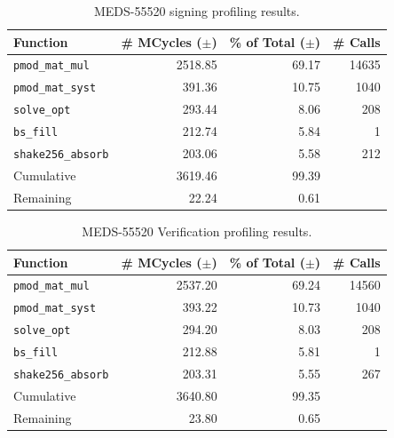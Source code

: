 \documentclass[11pt,a4paper]{report}
\theoremstyle{definition}
\begin{document}
\begin{table}
  \centering
  \caption{MEDS-55520 signing profiling results.}
  \begin{tabular}{lrrr}
    \toprule
    \textbf{Function}         & \textbf{\# MCycles} ($\pm$) & \textbf{\% of Total} ($\pm$) & \textbf{\# Calls} \\
    \midrule
    \texttt{pmod\_mat\_mul}   & 2518.85                     & 69.17                        & 14635             \\
    \texttt{pmod\_mat\_syst}  & 391.36                      & 10.75                        & 1040              \\
    \texttt{solve\_opt}       & 293.44                      & 8.06                         & 208               \\
    \texttt{bs\_fill}         & 212.74                      & 5.84                         & 1                 \\
    \texttt{shake256\_absorb} & 203.06                      & 5.58                         & 212               \\
    \midrule
    Cumulative                & 3619.46                     & 99.39                        &                   \\
    Remaining                 & 22.24                       & 0.61                         &                   \\
    \bottomrule
  \end{tabular}
  \label{tab:medssigningfunctions}
\end{table}

\begin{table}
  \centering
  \caption{MEDS-55520 Verification profiling results.}
  \begin{tabular}{lrrr}
    \toprule
    \textbf{Function}         & \textbf{\# MCycles} ($\pm$) & \textbf{\% of Total} ($\pm$) & \textbf{\# Calls} \\
    \midrule
    \texttt{pmod\_mat\_mul}   & 2537.20                     & 69.24                        & 14560             \\
    \texttt{pmod\_mat\_syst}  & 393.22                      & 10.73                        & 1040              \\
    \texttt{solve\_opt}       & 294.20                      & 8.03                         & 208               \\
    \texttt{bs\_fill}         & 212.88                      & 5.81                         & 1                 \\
    \texttt{shake256\_absorb} & 203.31                      & 5.55                         & 267               \\
    \midrule
    Cumulative                & 3640.80                     & 99.35                        &                   \\
    Remaining                 & 23.80                       & 0.65                         &                   \\
    \bottomrule
  \end{tabular}
  \label{tab:medsverificationfunctions}
\end{table}
\end{document}
